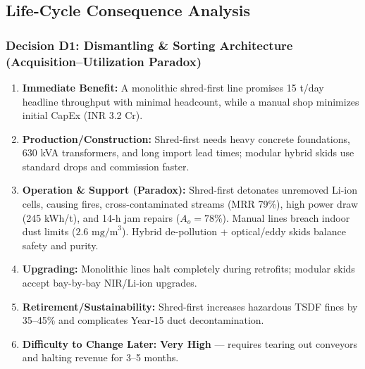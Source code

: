 \subsection{Life-Cycle Consequence Analysis}

\subsubsection*{Decision D1: Dismantling \& Sorting Architecture (Acquisition--Utilization Paradox)}
\begin{enumerate}
    \item \textbf{Immediate Benefit:} A monolithic shred-first line promises 15 t/day headline throughput with minimal headcount, while a manual shop minimizes initial CapEx (INR 3.2 Cr).
    \item \textbf{Production/Construction:} Shred-first needs heavy concrete foundations, 630 kVA transformers, and long import lead times; modular hybrid skids use standard drops and commission faster.
    \item \textbf{Operation \& Support (Paradox):} Shred-first detonates unremoved Li-ion cells, causing fires, cross-contaminated streams (MRR 79\%), high power draw (245 kWh/t), and 14-h jam repairs ($A_o = 78\%$). Manual lines breach indoor dust limits ($2.6\text{ mg/m}^3$). Hybrid de-pollution + optical/eddy skids balance safety and purity.
    \item \textbf{Upgrading:} Monolithic lines halt completely during retrofits; modular skids accept bay-by-bay NIR/Li-ion upgrades.
    \item \textbf{Retirement/Sustainability:} Shred-first increases hazardous TSDF fines by 35--45\% and complicates Year-15 duct decontamination.
    \item \textbf{Difficulty to Change Later:} \textbf{Very High} --- requires tearing out conveyors and halting revenue for 3--5 months.
\end{enumerate}

